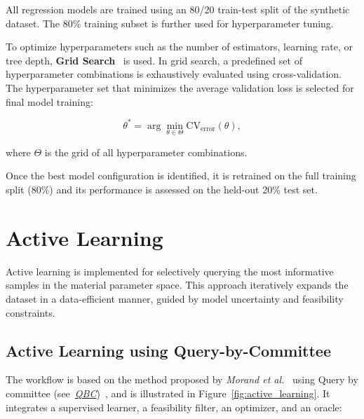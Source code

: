 \documentclass[class=scrbook, crop=false]{standalone}
\begin{document}
	All regression models are trained using an 80/20 train-test split of the synthetic dataset. The 80\% training subset is further used for hyperparameter tuning.

	To optimize hyperparameters such as the number of estimators, learning rate, or tree depth, \textbf{Grid Search}~\cite{pedregosa2011scikit} is used. In grid search, a predefined set of hyperparameter combinations is exhaustively evaluated using cross-validation. The hyperparameter set that minimizes the average validation loss is selected for final model training:
	
	\begin{equation}
		\theta^* = \arg\min_{\theta \in \Theta} \text{CV}_{\text{error}}(\theta),
	\end{equation}
	
	where $\Theta$ is the grid of all hyperparameter combinations.
	
	Once the best model configuration is identified, it is retrained on the full training split (80\%) and its performance is assessed on the held-out 20\% test set.
		
	\section{Active Learning}
	\label{Section::Active_Learning}
	
	Active learning is implemented for selectively querying the most informative samples in the material parameter space. This approach iteratively expands the dataset in a data-efficient manner, guided by model uncertainty and feasibility constraints.
	
	\subsection{Active Learning using Query-by-Committee}
	
	The workflow is based on the method proposed by \textit{Morand et al.}~\cite{morand2022efficient} using Query by committee (see~\textit{\hyperlink{QBC}{QBC}})~\cite{burbidge2007qbc}, and is illustrated in Figure~\ref{fig:active_learning}. It integrates a supervised learner, a feasibility filter, an optimizer, and an oracle:
	
\end{document}
